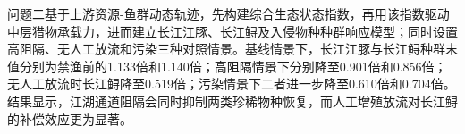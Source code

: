 问题二基于上游资源-鱼群动态轨迹，先构建综合生态状态指数，再用该指数驱动中层猎物承载力，进而建立长江江豚、长江鲟及入侵物种种群响应模型；同时设置高阻隔、无人工放流和污染三种对照情景。基线情景下，长江江豚与长江鲟种群末值分别为禁渔前的1.133倍和1.140倍；高阻隔情景下分别降至0.901倍和0.856倍；无人工放流时长江鲟降至0.519倍；污染情景下二者进一步降至0.610倍和0.704倍。结果显示，江湖通道阻隔会同时抑制两类珍稀物种恢复，而人工增殖放流对长江鲟的补偿效应更为显著。